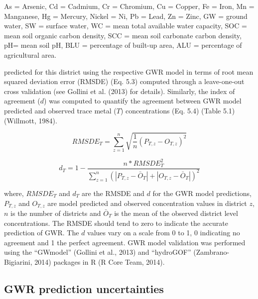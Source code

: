 \begin{landscape}
\begin{table}[h]
\begin{threeparttable}
\begin{tabular}
\bottomrule

\end{tabular}

\begin{tablenotes}
\footnotesize
As = Arsenic, Cd = Cadmium, Cr = Chromium, Cu = Copper, Fe = Iron, Mn = Manganese, Hg = Mercury, Nickel = Ni, Pb = Lead, Zn = Zinc,  GW = ground water, SW = surface water, WC = mean total available water capacity, SOC = mean soil organic carbon density, SCC = mean soil carbonate carbon density, pH= mean soil pH, BLU = percentage of built-up area, ALU = percentage of agricultural area.
\end{tablenotes}

\end{threeparttable}

\end{table}

\end{landscape}

\noindent predicted for this district using the respective GWR model in terms of root mean squared deviation error (RMSDE) (Eq. 5.3) computed through a leave-one-out cross validation (see Gollini et al. (2013) for details). Similarly, the index of agreement ($d$) was computed to quantify the agreement between GWR model predicted and observed trace metal ($T$) concentrations (Eq. 5.4) (Table 5.1) (Willmott, 1984).

\begin{equation}
RMSDE_T=\displaystyle\sum_{z=1}^{n}\sqrt{\frac{1}{n}(P_{T,z}-O_{T,z})^2}
\end{equation}

\begin{equation}
d_T=1-\frac{n*RMSDE_T^2}{\displaystyle\sum_{z=1}^{n}(|P_{T,z}-\bar{O}_T|+|O_{T,z}-\bar{O}_T|)^2}
\end{equation}

where, $RMSDE_T$ and $d_T$ are the RMSDE and $d$ for the GWR model predictions, $P_{T,z}$ and $O_{T,z}$ are model predicted and observed concentration values in district $z$, $n$ is the number of districts and $\bar{O}_T$ is the mean of the observed district level concentrations. The RMSDE should tend to zero to indicate the accurate prediction of GWR. The $d$ values vary on a scale from 0 to 1, 0 indicating no agreement and 1 the perfect agreement. GWR model validation was performed using the “GWmodel” (Gollini et al., 2013) and “hydroGOF” (Zambrano-Bigiarini, 2014) packages in R (R Core Team, 2014).

\subsection{GWR prediction uncertainties}
\label{GWR prediction uncertainties}

